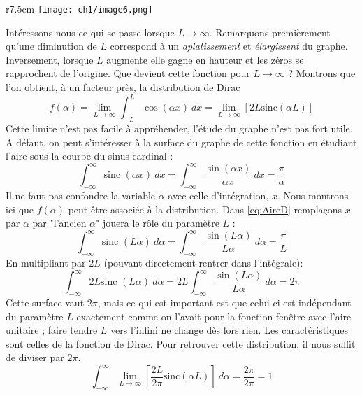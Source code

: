 \begin{wrapfigure}[8]{r}{7.5cm}
\vspace{-15mm}
\texttt{[image: ch1/image6.png]}
\end{wrapfigure}
Intéressons nous ce qui se passe lorsque $L \rightarrow \infty$. Remarquons premièrement 
qu'une diminution de $L$ correspond à un \textit{aplatissement} et \textit{élargissent} du 
graphe. Inversement, lorsque $L$ augmente elle gagne en hauteur et les zéros se rapprochent 
de l'origine. Que devient cette fonction pour $L \rightarrow\infty$ ? Montrons que l'on 
obtient, à un facteur près, la distribution de Dirac 
\begin{equation}
f(\alpha) = \lim\limits_{L\rightarrow\infty} \int_{-L}^L \cos(\alpha x)\ dx = \lim\limits_{L 
\rightarrow \infty}[2L\text{sinc}(\alpha L)]
\end{equation}
Cette limite n'est pas facile à appréhender, l'étude du graphe n'est pas fort utile. A 
défaut, on peut s'intéresser à la surface du graphe de cette fonction en étudiant l'aire 
sous la courbe du sinus cardinal :
\begin{equation}
\int_{-\infty}^\infty \text{sinc }(\alpha x)\ dx = \int_{-\infty}^\infty \dfrac{\sin(\alpha
x)}{\alpha x}\ dx = \dfrac{\pi}{\alpha}
\label{eq:AireD}
\end{equation}
\danger Il ne faut pas confondre la variable $\alpha$ avec celle d'intégration, $x$. Nous 
montrons ici que $f(\alpha)$ peut être associée à la distribution. Dans \autoref{eq:AireD} 
remplaçons $x$ par $\alpha$ par "l'ancien $\alpha$" jouera le rôle du paramètre $L$ :
\begin{equation}
\int_{-\infty}^\infty \text{sinc }(L\alpha)\ d\alpha = \int_{-\infty}^\infty \dfrac{\sin(L\alpha)
}{L\alpha}\ d\alpha = \dfrac{\pi}{L}
\end{equation}
En multipliant par $2L$ (pouvant directement rentrer dans l'intégrale):
\begin{equation}
\int_{-\infty}^\infty2L \text{sinc }(L\alpha)\ d\alpha = 2L \int_{-\infty}^\infty \dfrac{\sin(L\alpha)
}{L \alpha}\ d\alpha = 2\pi
\end{equation}
Cette surface vaut $2\pi$, mais ce qui est important est que celui-ci est indépendant 
du paramètre $L$ exactement comme on l'avait pour la fonction fenêtre avec l'aire unitaire ; 
faire tendre $L$ vers l'infini ne change dès lors rien. Les caractéristiques sont celles de 
la fonction de Dirac. Pour retrouver cette distribution, il nous suffit de diviser par $2\pi$.
\begin{equation}
\int_{-\infty}^\infty \lim\limits_{L\rightarrow\infty}[\frac{2L}{2\pi}\text{sinc}(\alpha L)]\ 
d\alpha = \frac{2\pi}{2\pi}=1
\end{equation}
